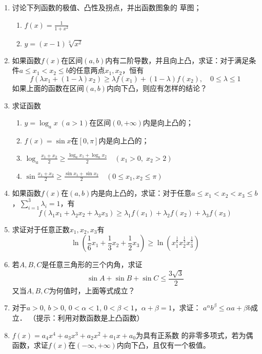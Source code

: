     \begin{ex}
    \begin{enumerate}
        \item 讨论下列函数的极值、凸性及拐点，并出函数图象的
        草图；
    \begin{multicols}{2}
    \begin{enumerate}
        \item $f(x)=\frac{1}{1+x^2}$
        \item $y=(x-1)\sqrt[3]{x^2}$
    \end{enumerate}
    \end{multicols}
    \item 如果函数$f(x)$在区间$(a,b)$内有二阶导数，并且向上凸，求证：对于满足条件$a\le x_1<x_2\le b$的任意两点$x_1,x_2$，恒有
    \[f (\lambda x_1+ (1-\lambda) x_2) \ge \lambda f (x_1) + (1-\lambda)f (x_2) ,\quad  0\le\lambda\le 1\]
    如果上面的函数在区间$(a,b)$内向下凸，则应有怎样的结论？
    \item 求证函数
    \begin{enumerate}
        \item $y=\log_ax \; (a>1)$在区间$(0,+\infty)$内是向上凸的；
        \item $f(x)=\sin x$在$[0,\pi]$内是向上凸的；
        \item $\log_a\frac{x_1+x_2}{2}\ge \frac{\log_a x_1+\log_a x_2}{2}\quad (x_1> 0,\; x_2>2)$
        \item $\sin\frac{x_1+x_2}{2}\ge \frac{\sin x_1+\sin x_2}{2}\quad  (0\le x_1,x_2\le \pi)$
    \end{enumerate}
    
    \item 如果函数$f(x)$在$(a,b)$内是向上凸的，求证：对于任意$a\le x_1<x_2<x_3\le b$，$\sum^3_{i=1}\lambda_i=1$，有
    \[f(\lambda_1x_1+\lambda_2x_2+\lambda_3x_3)\ge \lambda_1f(x_1)+\lambda_2f(x_2)+\lambda_3f(x_3)\]
    
    \item  求证对于任意正数$x_1,x_2,x_3$有
    \[\ln\left(\frac{1}{6}x_1+\frac{1}{3}x_2+\frac{1}{2}x_3\right) \ge \ln \left(x_1^{\tfrac{1}{6}}x_2^{\tfrac{1}{3}}x_3^{\tfrac{1}{2}} \right)\]
    \item  若$A,B,C$是任意三角形的三个内角，求证
    \[\sin A+\sin B+\sin C\le \frac{3\sqrt{3}}{2}\]
    又当$A,B,C$为何值时，上面等式成立？
    \item  对于$a>0$, $b>0$, $0<\alpha<1$, $0<\beta<1$，$\alpha+\beta=1$，求证：
    $a^{\alpha}b^{\beta}\le \alpha a+\beta b$成立．
    （提示：利用对数函数是上凸函数）
    \item  $f(x)=a_4x^4+a_3x^3+a_2x^2+a_1x+a_0$为具有正系数
    的非零多项式，若为偶函数，求证$f(x)$在$(-\infty,+\infty)$内向下凸，且仅有一个极值。
    \end{enumerate}
    \end{ex}
    
